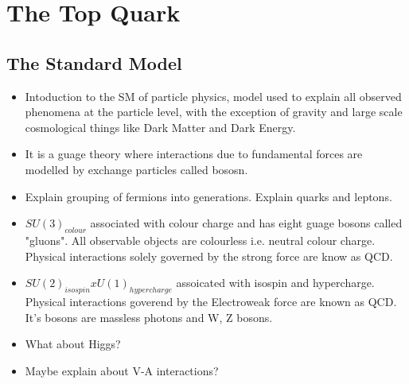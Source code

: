 \chapter{The Top Quark}
\label{Chapter:TheTopQuark}

\section{The Standard Model}

\begin{itemize}

\item Intoduction to the SM of particle physics, model used to explain all observed phenomena at the particle level, with the exception of gravity and large scale cosmological things like Dark Matter and Dark Energy.

\item It is a guage theory where interactions due to fundamental forces are modelled by exchange particles called bososn. 

\item Explain grouping of fermions into generations. Explain quarks and leptons.

\item $SU(3)_{colour}$ associated with colour charge and has eight guage bosons called "gluons". All observable objects are colourless i.e. neutral colour charge. Physical interactions solely governed by the strong force are know as QCD.

\item $SU(2)_{isospin} x U(1)_{hypercharge}$ assoicated with isospin and hypercharge. Physical interactions goverend by the Electroweak force are known as QCD. It's bosons are massless photons and W, Z bosons.

\item What about Higgs?

\item Maybe explain about V-A interactions?

\end{itemize}


